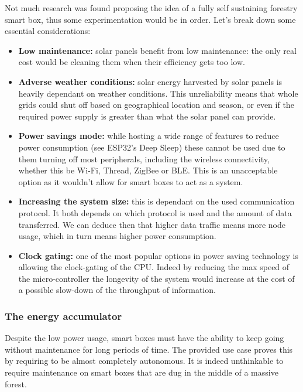 \documentclass[11pt]{article}
\begin{document}
Not much research was found proposing the idea of a fully self sustaining forestry smart box, thus some experimentation would be in order. Let's break down some essential considerations:
\begin{itemize}
    \item \textbf{Low maintenance:} solar panels benefit from low maintenance: the only real cost would be cleaning them when their efficiency gets too low.
    \item \textbf{Adverse weather conditions:} solar energy harvested by solar panels is heavily dependant on weather conditions. This unreliability means that whole grids could shut off based on geographical location and season, or even if the required power supply is greater than what the solar panel can provide.
    \item \textbf{Power savings mode:} while hosting a wide range of features to reduce power consumption (see ESP32's Deep Sleep) these cannot be used due to them turning off most peripherals, including the wireless connectivity, whether this be Wi-Fi, Thread, ZigBee or BLE. This is an unacceptable option as it wouldn't allow for smart boxes to act as a system.
    \item \textbf{Increasing the system size:} this is dependant on the used communication protocol. It both depends on which protocol is used and the amount of data transferred. We can deduce then that higher data traffic means more node usage, which in turn means higher power consumption.
    \item \textbf{Clock gating:} one of the most popular options in power saving technology is allowing the clock-gating of the CPU. Indeed by reducing the max speed of the micro-controller the longevity of the system would increase at the cost of a possible slow-down of the throughput of information.
\end{itemize}


\subsubsection{The energy accumulator}
Despite the low power usage, smart boxes must have the ability to keep going without maintenance for long periods of time. The provided use case proves this by requiring to be almost completely autonomous. It is indeed unthinkable to require maintenance on smart boxes that are dug in the middle of a massive forest. \par
\vspace{0.5 cm}
\end{document}
